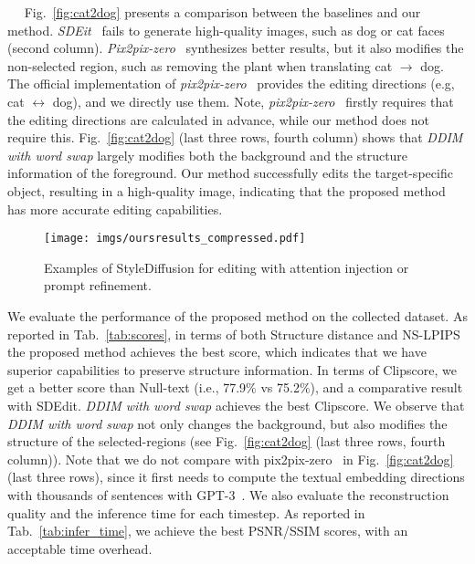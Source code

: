 \documentclass[twocolumn]{svjour3}          \smartqed  \usepackage{graphicx}
\newcommand{\minisection}[1]{\vspace{0.04in} \noindent {\bf #1}\ \ }
\begin{document}
\minisection{Qualitative and quantitative results.}
Fig.~\ref{fig:cat2dog}  presents a comparison between the baselines and our method. \textit{SDEit}~\citep{meng2021sdedit} fails to generate high-quality images, such as dog or cat faces (second column).  
\emph{Pix2pix-zero}~\citep{parmar2023zero} synthesizes better results, but it also modifies the non-selected region, such as removing the plant when translating cat $\rightarrow$ dog.   The official implementation of \emph{pix2pix-zero}~\citep{parmar2023zero} provides the editing directions (e.g, cat $\leftrightarrow$ dog), and we directly use them. Note, \emph{pix2pix-zero}~\citep{parmar2023zero} firstly requires that the editing directions are calculated in advance, while our method does not require this.   Fig.~\ref{fig:cat2dog} (last three rows, fourth column) shows that \textit{DDIM with word swap} largely modifies both the background and the structure information of the foreground.  Our method successfully edits the target-specific object, resulting in a high-quality image, indicating that the proposed method has more accurate editing capabilities.


\begin{figure*}[t]
    \centering

\texttt{[image: imgs/oursresults\_compressed.pdf]} 
\caption{Examples of StyleDiffusion for editing with   attention injection or prompt refinement.}
\label{fig:oursresults}
\end{figure*}

We evaluate the performance of the proposed method on the collected dataset.  As reported in Tab.~\ref{tab:scores},  in terms of both Structure distance and NS-LPIPS the proposed method achieves the best score, which indicates that we have superior capabilities to preserve structure information. In terms of Clipscore,  we get a better score than Null-text (i.e., 77.9$\%$ vs 75.2$\%$), and a comparative result with SDEdit. \textit{DDIM with word swap} achieves the best Clipscore. We observe that \textit{DDIM with word swap} not only changes the background, but also modifies the structure of the selected-regions (see Fig.~\ref{fig:cat2dog} (last three rows, fourth column)). Note that we do not compare with pix2pix-zero~\citep{parmar2023zero} in Fig.~\ref{fig:cat2dog} (last three rows), since it first needs to compute the textual embedding directions with thousands of sentences with GPT-3~\citep{brown2020language}. We also evaluate the reconstruction quality and the inference time for each timestep. As reported in  Tab.~\ref{tab:infer_time}, we achieve the best PSNR/SSIM scores, with an acceptable time overhead.
  
\end{document}
